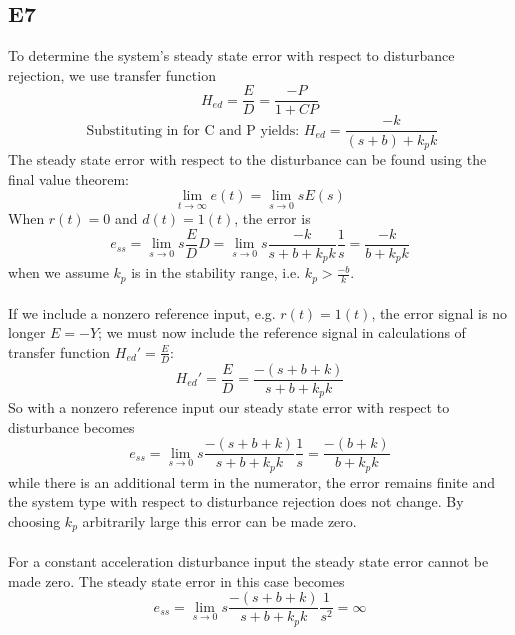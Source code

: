\documentclass[10pt,titlepage]{article}
\begin{document}
	\subsection*{E7}
		To determine the system's steady state error with respect to disturbance rejection, we use transfer function 
		\begin{equation}
			H_{ed}=\frac{E}{D}=\frac{-P}{1+CP}
		\end{equation}
		\begin{equation}\label{eq:propHed}
			\mbox{ Substituting in for C and P yields: } H_{ed}=\frac{-k}{(s+b)+k_pk}
		\end{equation}
		The steady state error with respect to the disturbance can be found using the final value theorem: 
		\begin{equation}
			\lim_{t\to\infty}e(t)=\lim_{s\to0}sE(s)
		\end{equation}
		When $r(t)=0$ and $d(t)=1(t)$, the error is
		\begin{equation}
			e_{ss}=\lim_{s\to0}s\frac{E}{D}D=\lim_{s\to0}s\frac{-k}{s+b+k_pk}\frac{1}{s}=\frac{-k}{b+k_pk}
		\end{equation}
		when we assume $k_p$ is in the stability range, i.e. $k_p > \frac{-b}{k}$. \\\\
		If we include a nonzero reference input, e.g. $r(t)=1(t)$, the error signal is no longer $E=-Y$; we must now include the reference signal in calculations of transfer function $H_{ed}'=\frac{E}{D}$:
		\begin{equation}
			H_{ed}'=\frac{E}{D}=\frac{-(s+b+k)}{s+b+k_pk}
		\end{equation}
		So with a nonzero reference input our steady state error with respect to disturbance becomes
		\begin{equation}
			e_{ss}=\lim_{s\to0}s\frac{-(s+b+k)}{s+b+k_pk}\frac{1}{s}=\frac{-(b+k)}{b+k_pk}
			\end{equation}
		while there is an additional term in the numerator, the error remains finite and the system type with respect to disturbance rejection does not change. By choosing $k_p$ arbitrarily large this error can be made zero.\\\\
		
		For a constant acceleration disturbance input the steady state error cannot be made zero. The steady state error in this case becomes
		$$e_{ss}=\lim_{s\to0}s\frac{-(s+b+k)}{s+b+k_pk}\frac{1}{s^2} =\infty$$
		
\end{document}
